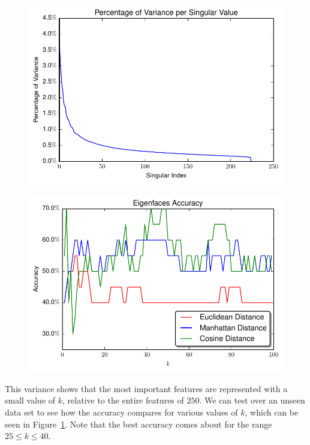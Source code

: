 \documentclass{article}
\begin{document}
\begin{figure}
\centering
\begin{minipage}{.5\textwidth}
  \centering
  \includegraphics[width=.85\linewidth]{data/Singularvalue_Variance.pdf}
  \label{fig:lam_var}
\end{minipage}%
\begin{minipage}{.5\textwidth}
  \centering
  \includegraphics[width=.85\linewidth]{data/Accuracy.pdf}
  \label{fig:eig_acc}
\end{minipage}
\end{figure}

This variance shows that the most important features are represented with a small value of $k$, relative to the entire features of $250$. We can test over an unseen data set to see how the accuracy compares for various values of $k$, which can be seen in Figure~\ref{fig:eig_acc}. Note that the best accuracy comes about for the range $25 \leq k \leq 40$.
\end{document}
